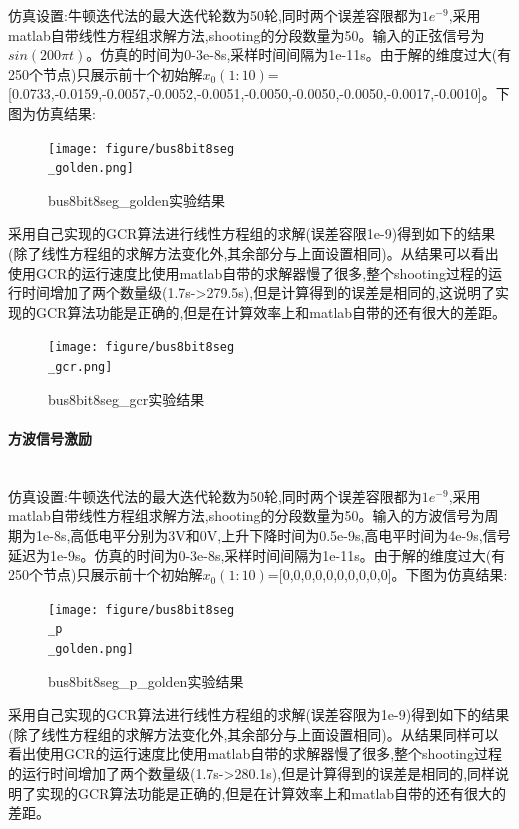 \documentclass[12pt]{article}
\newcommand{\subsubsubsection}[1]{\paragraph{#1}\mbox{}\\}
\begin{document}
\begin{sloppypar}
\qquad 仿真设置:牛顿迭代法的最大迭代轮数为50轮,同时两个误差容限都为$1e^{-9}$,采用matlab自带线性方程组求解方法,shooting的分段数量为50。输入的正弦信号为$sin(200\pi t)$。仿真的时间为0-3e-8s,采样时间间隔为1e-11s。由于解的维度过大(有250个节点)只展示前十个初始解$x_0(1:10)$=[0.0733,-0.0159,-0.0057,-0.0052,-0.0051,-0.0050,-0.0050,-0.0050,-0.0017,-0.0010]。下图为仿真结果:

\begin{figure}[H]
  \centering
  \texttt{[image: figure/bus8bit8seg\\\_golden.png]}
  \caption{bus8bit8seg\_golden实验结果}
\end{figure}

\qquad 采用自己实现的GCR算法进行线性方程组的求解(误差容限1e-9)得到如下的结果(除了线性方程组的求解方法变化外,其余部分与上面设置相同)。从结果可以看出使用GCR的运行速度比使用matlab自带的求解器慢了很多,整个shooting过程的运行时间增加了两个数量级(1.7s->279.5s),但是计算得到的误差是相同的,这说明了实现的GCR算法功能是正确的,但是在计算效率上和matlab自带的还有很大的差距。

\begin{figure}[H]
  \centering
  \texttt{[image: figure/bus8bit8seg\\\_gcr.png]}
  \caption{bus8bit8seg\_gcr实验结果}
\end{figure}

\subsubsubsection{方波信号激励}

\qquad 仿真设置:牛顿迭代法的最大迭代轮数为50轮,同时两个误差容限都为$1e^{-9}$,采用matlab自带线性方程组求解方法,shooting的分段数量为50。输入的方波信号为周期为1e-8s,高低电平分别为3V和0V,上升下降时间为0.5e-9s,高电平时间为4e-9s,信号延迟为1e-9s。仿真的时间为0-3e-8s,采样时间间隔为1e-11s。由于解的维度过大(有250个节点)只展示前十个初始解$x_0(1:10)$=[0,0,0,0,0,0,0,0,0,0]。下图为仿真结果:

\begin{figure}[H]
  \centering
  \texttt{[image: figure/bus8bit8seg\\\_p\\\_golden.png]}
  \caption{bus8bit8seg\_p\_golden实验结果}
\end{figure}

\qquad 采用自己实现的GCR算法进行线性方程组的求解(误差容限为1e-9)得到如下的结果(除了线性方程组的求解方法变化外,其余部分与上面设置相同)。从结果同样可以看出使用GCR的运行速度比使用matlab自带的求解器慢了很多,整个shooting过程的运行时间增加了两个数量级(1.7s->280.1s),但是计算得到的误差是相同的,同样说明了实现的GCR算法功能是正确的,但是在计算效率上和matlab自带的还有很大的差距。


\end{sloppypar}
\end{document}

